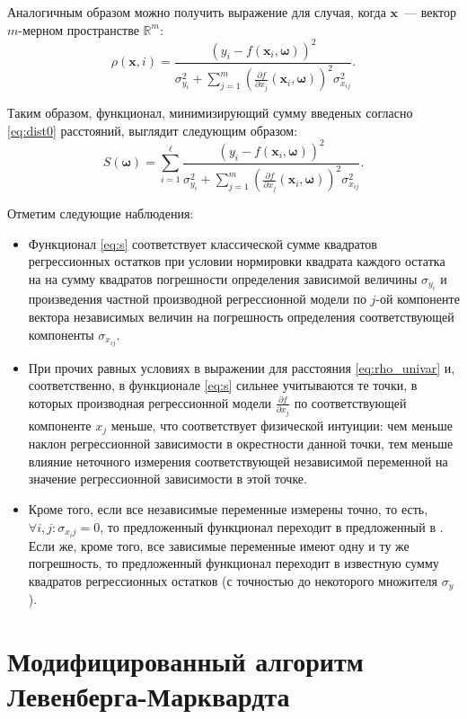 \documentclass[11pt,a4paper]{article}
\newcommand{\bomega}{\boldsymbol{\omega}}
\begin{document}
Аналогичным образом можно получить выражение для случая, когда $\mathbf{x}$~---
вектор $m$-мерном пространстве $\mathbb{R}^m$:
\[
  \rho(\mathbf{x}, i) = \frac{(y_i - f(\mathbf{x}_i, \bomega))^2}{\sigma_{y_i}^2 + \sum_{j = 1}^m (\frac{\partial f}{\partial x_j}(\mathbf{x}_i, \bomega))^2 \sigma^2_{x_{ij}}}.
\]

Таким образом, функционал, минимизирующий сумму введеных согласно \eqref{eq:dist0}
расстояний, выглядит следующим образом:
\begin{equation}
  S(\bomega) = \sum_{i = 1}^\ell \frac{(y_i - f(\mathbf{x}_i, \bomega))^2}{\sigma_{y_i}^2 + \sum_{j = 1}^m (\frac{\partial f}{\partial x_j}(\mathbf{x}_i, \bomega))^2 \sigma^2_{x_{ij}}}.
  \label{eq:s}
\end{equation}

Отметим следующие наблюдения:
\begin{itemize}
  \item Функционал \eqref{eq:s} соответствует классической сумме квадратов регрессионных
	остатков при условии нормировки квадрата каждого остатка на на сумму квадратов погрешности
	определения зависимой величины $\sigma_{y_i}$ и произведения частной производной
	регрессионной модели по $j$-ой компоненте вектора независимых величин на погрешность
	определения соответствующей компоненты $\sigma_{x_{ij}}$.

  \item При прочих равных условиях в выражении для расстояния \eqref{eq:rho_univar} и,
	соответственно, в функционале \eqref{eq:s} сильнее учитываются те точки, в которых
	производная регрессионной модели $\frac{\partial f}{\partial x_j}$ по соответствующей
	компоненте $x_j$ меньше, что соответствует физической интуиции: чем меньше наклон
	регрессионной зависимости в окрестности данной точки, тем меньше влияние неточного
	измерения соответствующей независимой переменной на значение регрессионной зависимости
	в этой точке.

  \item Кроме того, если все независимые переменные измерены точно, то есть,
	$\forall i, j : \sigma_{x_ij} = 0$, то предложенный функционал переходит в предложенный
	в \cite{...}. Если же, кроме того, все зависимые переменные имеют одну и ту же погрешность,
	то предложенный функционал переходит в известную сумму квадратов регрессионных остатков
	(с точностью до некоторого множителя $\sigma_y$).
\end{itemize}

\section{Модифицированный алгоритм Левенберга-Марквардта}
\end{document}
